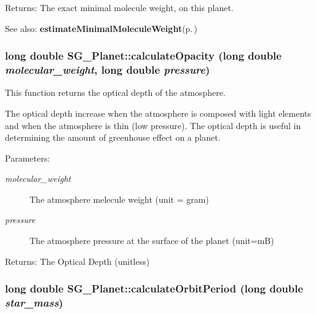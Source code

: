 \begin{Desc}
\item[Returns:]The exact minimal molecule weight, on this planet. \end{Desc}
\begin{Desc}
\item[See also:]{\bf estimate\-Minimal\-Molecule\-Weight}{\rm (p.\,\pageref{class_s_g___planet_b26})} \end{Desc}
\subsubsection{\setlength{\rightskip}{0pt plus 5cm}long double SG\_\-Planet::calculate\-Opacity (long double {\em molecular\_\-weight}, long double {\em pressure})\hspace{0.3cm}{\tt  [protected]}}\label{class_s_g___planet_b20}


This function returns the optical depth of the atmosphere. 

The optical depth increase when the atmosphere is composed with light elements and when the atmosphere is thin (low pressure). The optical depth is useful in determining the amount of greenhouse effect on a planet. \begin{Desc}
\item[Parameters:]
\begin{description}
\item[{\em molecular\_\-weight}]The atmosphere melecule weight (unit = gram) \item[{\em pressure}]The atmosphere pressure at the surface of the planet (unit=m\-B) \end{description}
\end{Desc}
\begin{Desc}
\item[Returns:]The Optical Depth (unitless) \end{Desc}
\subsubsection{\setlength{\rightskip}{0pt plus 5cm}long double SG\_\-Planet::calculate\-Orbit\-Period (long double {\em star\_\-mass})\hspace{0.3cm}{\tt  [protected]}}\label{class_s_g___planet_b3}


